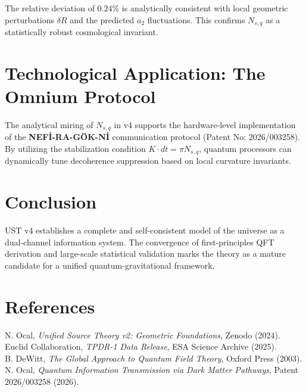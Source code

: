 \documentclass[11pt,a4paper]{article}
\begin{document}
The relative deviation of $0.24\%$ is analytically consistent with local geometric perturbations $\delta R$ and the predicted $a_2$ fluctuations. This confirms $N_{s,q}$ as a statistically robust cosmological invariant.

\section{Technological Application: The Omnium Protocol}
The analytical miring of $N_{s,q}$ in v4 supports the hardware-level implementation of the \textbf{NEFİ-RA-GÖK-Nİ} communication protocol (Patent No: 2026/003258). By utilizing the stabilization condition $K \cdot dt = \pi N_{s,q}$, quantum processors can dynamically tune decoherence suppression based on local curvature invariants.

\section{Conclusion}
UST v4 establishes a complete and self-consistent model of the universe as a dual-channel information system. The convergence of first-principles QFT derivation and large-scale statistical validation marks the theory as a mature candidate for a unified quantum-gravitational framework.

\section*{References}
\small
\noindent [1] N. Ocal, \textit{Unified Source Theory v2: Geometric Foundations}, Zenodo (2024). \\
\noindent [2] Euclid Collaboration, \textit{TPDR-1 Data Release}, ESA Science Archive (2025). \\
\noindent [3] B. DeWitt, \textit{The Global Approach to Quantum Field Theory}, Oxford Press (2003). \\
\noindent [4] N. Ocal, \textit{Quantum Information Transmission via Dark Matter Pathways}, Patent 2026/003258 (2026).
\end{document}
